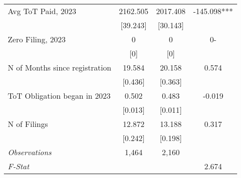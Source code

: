 \begin{tabular}{lccc}
 \addlinespace 
Avg ToT Paid, 2023 & 2162.505 & 2017.408 & -145.098***\\
 & {}[39.243] & {}[30.143] & \\
Zero Filing, 2023 & 0 & 0 & 0-\\
 & {}[0] & {}[0] & \\
N of Months since registration & 19.584 & 20.158 & 0.574\\
 & {}[0.436] & {}[0.363] & \\
ToT Obligation began in 2023 & 0.502 & 0.483 & -0.019\\
 & {}[0.013] & {}[0.011] & \\
N of Filings & 12.872 & 13.188 & 0.317\\
 & {}[0.242] & {}[0.198] & \\
\midrule
\textit{Observations} & 1,464 & 2,160 & \\
\textit{F-Stat} &  &  & 2.674\\
\bottomrule
\end{tabular}
